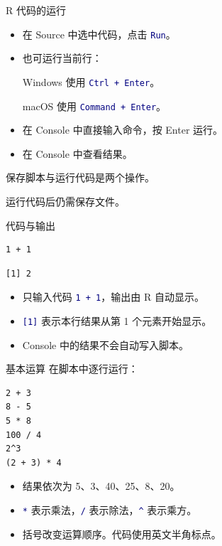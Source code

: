 \documentclass[14pt,compress,t,noamsthm,notheorem,table,handout,fontset=none]{ctexbeamer}
\newcommand{\code}[1]{\textcolor{navy}{\texttt{#1}}}
\newcommand{\inputlabel}{\par\smallskip{\fontsize{10.5}{13}\selectfont\bfseries\color{muted}输入代码\par}}
\newcommand{\outputlabel}{\par\smallskip{\fontsize{10.5}{13}\selectfont\bfseries\color{muted}Console 输出\par}}
\begin{document}
\begin{frame}{R 代码的运行}
  \begin{itemize}
    \item 在 Source 中选中代码，点击 \code{Run}。
    \item 也可运行当前行：\par
      Windows 使用 \code{Ctrl + Enter}。\par
      macOS 使用 \code{Command + Enter}。
    \item 在 Console 中直接输入命令，按 Enter 运行。
    \item 在 Console 中查看结果。
  \end{itemize}
  \vfill
  保存脚本与运行代码是两个操作。\par 运行代码后仍需保存文件。
\end{frame}

\begin{frame}[fragile]{代码与输出}
  \inputlabel
\begin{lstlisting}
1 + 1
\end{lstlisting}
  \outputlabel
\begin{lstlisting}[style=output]
[1] 2
\end{lstlisting}
  \begin{itemize}
    \item 只输入代码 \code{1 + 1}，输出由 R 自动显示。
    \item \code{[1]} 表示本行结果从第 1 个元素开始显示。
    \item Console 中的结果不会自动写入脚本。
  \end{itemize}
\end{frame}

\begin{frame}[fragile]{基本运算}
  在脚本中逐行运行：
\begin{lstlisting}
2 + 3
8 - 5
5 * 8
100 / 4
2^3
(2 + 3) * 4
\end{lstlisting}
  \begin{itemize}
    \item 结果依次为 5、3、40、25、8、20。
    \item \code{*} 表示乘法，\code{/} 表示除法，\code{\^{}} 表示乘方。
    \item 括号改变运算顺序。代码使用英文半角标点。
  \end{itemize}
\end{frame}
\end{document}
